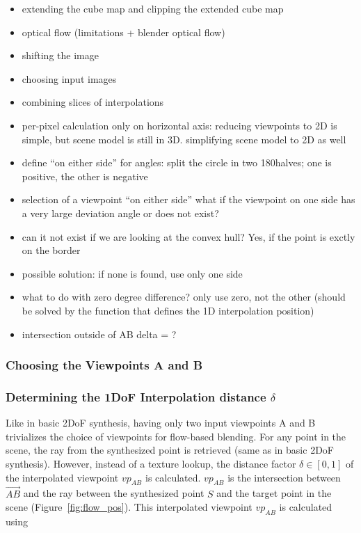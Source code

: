 \begin{itemize}
  \item extending the cube map and clipping the extended cube map
  \item optical flow (limitations + blender optical flow)
  \item shifting the image
  \item choosing input images
  \item combining slices of interpolations
  \item per-pixel calculation only on horizontal axis: reducing viewpoints to 2D is simple, but scene model is still in 3D. simplifying scene model to 2D as well
  \item define ``on either side'' for angles: split the circle in two 180\degree halves; one is positive, the other is negative
  \item selection of a viewpoint ``on either side'' \ar what if the viewpoint on one side has a very large deviation angle or does not exist?
  \item can it not exist if we are looking at the convex hull? Yes, if the point is exctly on the border
  \item possible solution: if none is found, use only one side
  \item what to do with zero degree difference? \ar only use zero, not the other (should be solved by the function that defines the 1D interpolation position)
  \item intersection outside of AB \ar delta = ?
\end{itemize}


\subsubsection{Choosing the Viewpoints A and B}

\subsubsection{Determining the 1DoF Interpolation distance $\delta$} \label{subsec:flow-based-blending}
Like in basic 2DoF synthesis, having only two input viewpoints A and B trivializes the choice of viewpoints for flow-based blending. For any point in the scene, the ray from the synthesized point is retrieved (same as in basic 2DoF synthesis). However, instead of a texture lookup, the distance factor $\delta \in [0,1]$ of the interpolated viewpoint $vp_{AB}$ is calculated. $vp_{AB}$ is the intersection between $\overrightarrow{AB}$ and the ray between the synthesized point $S$ and the target point in the scene (Figure~\ref{fig:flow_pos}). This interpolated viewpoint $vp_{AB}$ is calculated using 

